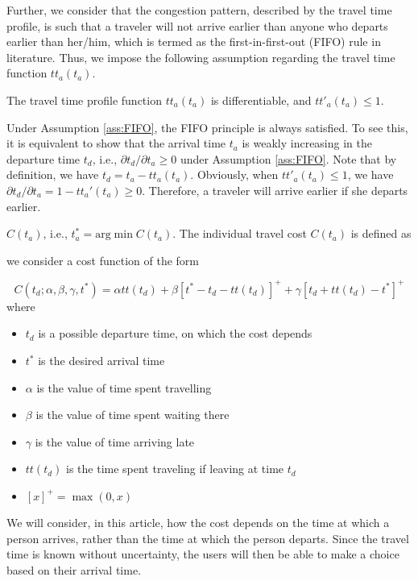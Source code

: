 Further, we consider that the congestion pattern, described by the travel time profile, is such that a traveler will not arrive earlier than anyone who departs earlier than her/him, which is termed as the first-in-first-out (FIFO) rule in literature. Thus, we impose the following assumption regarding the travel time function  $tt_a(t_a)$.



\begin{assumption}\label{ass:FIFO}
The travel time profile function $tt_a(t_a)$ is differentiable, and $tt'_a(t_a) \le 1$. 
\end{assumption}


Under Assumption \ref{ass:FIFO}, the FIFO principle is always satisfied. To see this, it is equivalent to show that the arrival time $t_a$ is weakly increasing in the departure time $t_d$, i.e., $\partial t_d / \partial t_a \ge 0$ under Assumption \ref{ass:FIFO}.  Note that by definition, we have $ t_d = t_a - tt_a(t_a)$.  Obviously, when $tt'_a(t_a) \le 1$, we have $\partial t_d / \partial t_a = 1 - tt_a'(t_a) \ge 0$. Therefore, a traveler will arrive earlier if she departs earlier. 



$C(t_a)$, i.e.,  $t_a^* = \text{arg} \min C(t_a)$. The individual travel cost $C(t_a)$ is defined as 

we consider a cost function of the form

\begin{equation}
  \label{eq:cost-t_d}
  C(t_d; \alpha, \beta, \gamma, t^*) = \alpha tt(t_d) + \beta[t^*-t_d-tt(t_d)]^+ + \gamma[t_d+tt(t_d)-t^*]^+ 
\end{equation}
where
\begin{itemize}
\item \(t_d\) is a possible departure time, on which the cost depends
\item \(t^*\) is the desired arrival time
\item \(\alpha\) is the value of time spent travelling
\item \(\beta\) is the value of time spent waiting there
\item \(\gamma\) is the value of time arriving late
\item \(tt(t_d)\) is the time spent traveling if leaving at time \(t_d\)
\item \([x]^+ = \max(0, x)\)
\end{itemize}

We will consider, in this article,
how the cost depends on the time at which a person arrives,
rather than the time at which the person departs.
Since the travel time is known without uncertainty,
the users will then be able to make a choice based on their arrival time.

